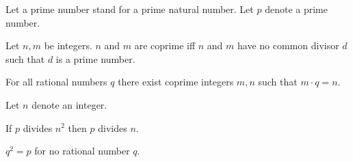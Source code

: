 \documentclass{article}
\begin{document}
\begin{forthel}

Let a prime number stand for a prime natural number.
Let $p$ denote a prime number.


\begin{definition}
    Let $n,m$ be integers.
    $n$ and $m$ are coprime iff $n$ and $m$ have no common divisor $d$ such that $d$ is a prime number.
\end{definition}

\begin{lemma}
    For all rational numbers $q$ there exist coprime integers $m,n$ such that $m \cdot q = n$.
\end{lemma}



Let $n$ denote an integer.
\begin{lemma}
    If $p$ divides $n^{2}$ then $p$ divides $n$.
\end{lemma}



\begin{proposition}
    $q^{2} = p$ for no rational number $q$.
\end{proposition}
\end{forthel}
\end{document}
